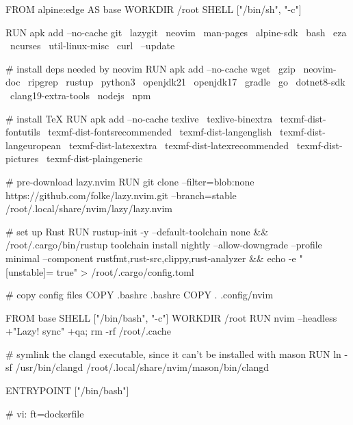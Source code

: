 FROM alpine:edge AS base
WORKDIR /root
SHELL ["/bin/sh", "-c"]

RUN apk add --no-cache git \
                       lazygit \
                       neovim \
                       man-pages \
                       alpine-sdk \
                       bash \
                       eza \
                       ncurses \
                       util-linux-misc \
                       curl \
                       --update

# install deps needed by neovim
RUN apk add --no-cache wget \
                       gzip \
                       neovim-doc \
                       ripgrep \
                       rustup \
                       python3 \
                       openjdk21 \
                       openjdk17 \
                       gradle \
                       go \
                       dotnet8-sdk \
                       clang19-extra-tools \
                       nodejs \
                       npm 

# install TeX
RUN apk add --no-cache texlive \
                       texlive-binextra \
                       texmf-dist-fontutils \
                       texmf-dist-fontsrecommended \
                       texmf-dist-langenglish \
                       texmf-dist-langeuropean \
                       texmf-dist-latexextra \
                       texmf-dist-latexrecommended \
                       texmf-dist-pictures \
                       texmf-dist-plaingeneric 

# pre-download lazy.nvim
RUN git clone --filter=blob:none https://github.com/folke/lazy.nvim.git --branch=stable /root/.local/share/nvim/lazy/lazy.nvim

# set up Rust
RUN rustup-init -y --default-toolchain none && /root/.cargo/bin/rustup toolchain install nightly --allow-downgrade --profile minimal --component rustfmt,rust-src,clippy,rust-analyzer && echo -e "[unstable]\ngc = true" > /root/.cargo/config.toml

# copy config files
COPY .bashrc .bashrc
COPY . .config/nvim

FROM base
SHELL ["/bin/bash", "-c"]
WORKDIR /root
RUN nvim --headless +"Lazy! sync" +qa; rm -rf /root/.cache

# symlink the clangd executable, since it can't be installed with mason
RUN ln -sf /usr/bin/clangd /root/.local/share/nvim/mason/bin/clangd

ENTRYPOINT ["/bin/bash"]

# vi: ft=dockerfile
